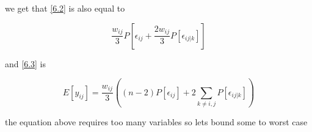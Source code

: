 \documentclass{article}
\theoremstyle{definition}
\begin{document}
we get that \ref{6.2} is also equal to 

\begin{equation}
    \frac{w_{ij}}{3}P[\epsilon_{ij} + \frac{2w_{ij}}{3}P[\epsilon_{ij\vert k}]]
\end{equation}

and \ref{6.3} is

\begin{equation}
    E[y_{ij}]=\frac{w_{ij}}{3}\left( (n-2)P[\epsilon_{ij}] + 2\sum_{k\neq i,j}^{}P[\epsilon_{ij\vert k}] \right)
\end{equation}

the equation above requires too many variables so lets bound some to worst case
\end{document}
